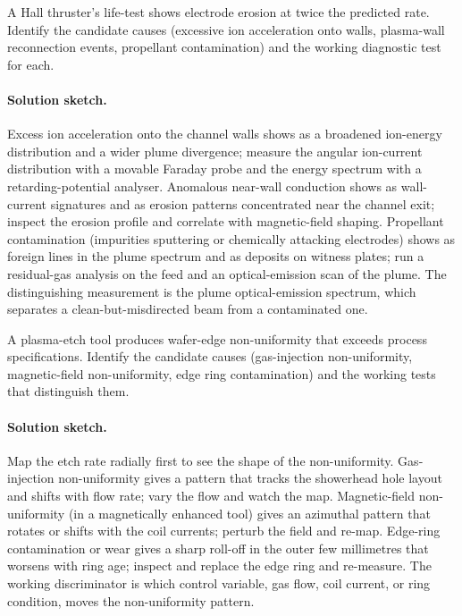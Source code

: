 \begin{exercise}
A Hall thruster's life-test shows electrode erosion at twice the
predicted rate. Identify the candidate causes (excessive ion
acceleration onto walls, plasma-wall reconnection events, propellant
contamination) and the working diagnostic test for each.
\paragraph{Solution sketch.} Excess ion acceleration onto the channel
walls shows as a broadened ion-energy distribution and a wider plume
divergence; measure the angular ion-current distribution with a movable
Faraday probe and the energy spectrum with a retarding-potential analyser.
Anomalous near-wall conduction shows as wall-current signatures and as
erosion patterns concentrated near the channel exit; inspect the erosion
profile and correlate with magnetic-field shaping. Propellant contamination
(impurities sputtering or chemically attacking electrodes) shows as
foreign lines in the plume spectrum and as deposits on witness plates;
run a residual-gas analysis on the feed and an optical-emission scan of
the plume. The distinguishing measurement is the plume optical-emission
spectrum, which separates a clean-but-misdirected beam from a contaminated
one.
\end{exercise}

\begin{exercise}
A plasma-etch tool produces wafer-edge non-uniformity that exceeds
process specifications. Identify the candidate causes (gas-injection
non-uniformity, magnetic-field non-uniformity, edge ring
contamination) and the working tests that distinguish them.
\paragraph{Solution sketch.} Map the etch rate radially first to see the
shape of the non-uniformity. Gas-injection non-uniformity gives a pattern
that tracks the showerhead hole layout and shifts with flow rate; vary the
flow and watch the map. Magnetic-field non-uniformity (in a magnetically
enhanced tool) gives an azimuthal pattern that rotates or shifts with the
coil currents; perturb the field and re-map. Edge-ring contamination or
wear gives a sharp roll-off in the outer few millimetres that worsens with
ring age; inspect and replace the edge ring and re-measure. The working
discriminator is which control variable, gas flow, coil current, or ring
condition, moves the non-uniformity pattern.
\end{exercise}

